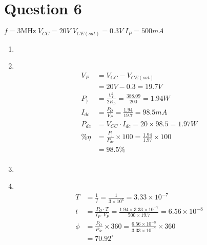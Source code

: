 \documentclass[11pt]{article}
\newcommand\Item[1][]{%
  \ifx\relax#1\relax  \item \else \item[#1] \fi
  \abovedisplayskip=0pt\abovedisplayshortskip=0pt~\vspace*{-\baselineskip}}
\begin{document}
\section*{Question 6}
$f=3\mathrm{MHz} \; V_{CC} = 20V \; V_{CE(sat)} = 0.3V \; I_{P}=500mA$
\begin{enumerate}[label=\roman*)]
  \Item %
    \begin{align*}
      V_{P} &= V_{CC} - V_{CE(sat)} \\
      &= 20V - 0.3 = 19.7V \\
      P_{)} &= \frac{V_{P}^{2}}{2R_{L}} = \frac{388.09}{200} = 1.94W \\
      I_{dc} &= \frac{P_{O}}{V_{P}} = \frac{1.94}{19.7} = 98.5mA \\
      P_{dc} &= V_{CC}{\cdot}I_{dc} = 20 \times 98.5 = 1.97W \\
      \% \eta &= \frac{P_{)}}{P_{dc}} \times 100 = \frac{1.94}{1.97} \times 100 \\ &= 98.5\% \\ 
    \end{align*}
  \Item %
    \begin{align*}
      T &= \frac{1}{f} = \frac{1}{3{\times}10^{6}} = 3.33{\times}10^{-7} \\
      t &= \frac{P_{O}{\cdot}T}{I_{P}{\cdot}V_{P}} = \frac{1.94{\times}3.33 {\times}10^{-7}}{500{\times}19.7} = 6.56{\times}10^{-8} \\
      \phi &= \frac{P_{O}}{P_{dc}} \times 360 = \frac{6.56{\times}10^{-8}}{3.33{\times}10^{-7}} \times 360 \\ &= 70.92^{\circ}
    \end{align*}
\end{enumerate}
\end{document}
